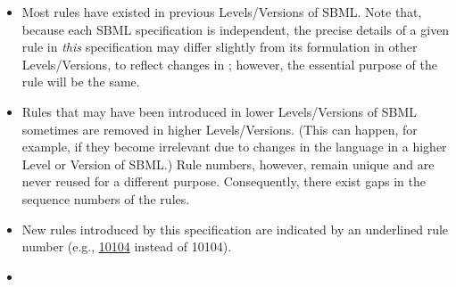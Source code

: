 \begin{itemize}
\begin{description}
  \end{description}

\item Most rules have existed in previous Levels/Versions of SBML.
  Note that, because each SBML specification is independent, the
  precise details of a given rule in \emph{this} specification may
  differ slightly from its formulation in other Levels/Versions,
  to reflect changes in \sbmlthree; however, the essential purpose
  of the rule will be the same.

\item Rules that may have been introduced in lower Levels/Versions
  of SBML sometimes are removed in higher Levels/Versions.  (This
  can happen, for example, if they become irrelevant due to
  changes in the language in a higher Level or Version of SBML.)
  Rule numbers, however, remain unique and are never reused for a
  different purpose.  Consequently, there exist gaps in the
  sequence numbers of the rules.

\item New rules introduced by this \sbmlthree specification are
  indicated by an underlined rule number (e.g., \underline{10104}
  instead of 10104).

\item {}

\end{itemize}


